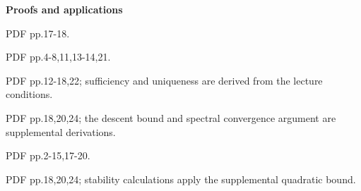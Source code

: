 \documentclass[11pt,a4paper]{article}
\begin{document}
\textbf{Proofs and applications}
\begin{description}[leftmargin=12mm,itemsep=1pt]
\item[25] PDF pp.17-18.
\item[26] PDF pp.4-8,11,13-14,21.
\item[27] PDF pp.12-18,22; sufficiency and uniqueness are derived from the lecture conditions.
\item[28] PDF pp.18,20,24; the descent bound and spectral convergence argument are supplemental derivations.
\item[29] PDF pp.2-15,17-20.
\item[30] PDF pp.18,20,24; stability calculations apply the supplemental quadratic bound.
\end{description}
\end{document}

